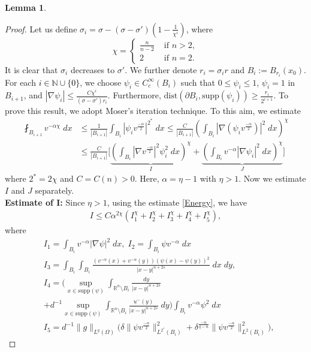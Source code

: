 \documentclass[11pt, notitlepage]{article}
\def\R{\mathbb{R}}
\newtheorem{Lemma}[Theorem]{Lemma}
\begin{document}
{\begin{Lemma}
\end{Lemma}
\begin{proof}
Let us define $\sigma_i=\sigma-(\sigma-\sigma')(1-\frac{1}{\chi^i})$, where $$\chi=\begin{cases}
    \frac{n}{n-2}&\text{ if }n>2,\\
    2&\text{ if }n=2.
\end{cases}$$
It is clear that $\sigma_i$ decreases to $\sigma'$. We further denote $r_i=\sigma_i r$ and $B_i:=B_{r_i}(x_0)$. For each \textcolor{black}{$i\in \mathbb{N}\cup\{0\}$}, we choose $\psi_i\in C^\infty_c(B_i)$ such that $0\leq \psi_i\leq 1$, $\psi_i=1$ in $B_{i+1}$, and $|\nabla\psi_i|\leq \frac{C\chi^i}{(\sigma-\sigma')r_i}$. Furthermore, $\mathrm{dist}(\partial B_i,\mathrm{supp}(\psi_i))\geq \frac{r_i}{2^{i+1}}$. To prove this result, we adopt Moser's iteration technique. To this aim, we estimate
\begin{align}
    \fint_{B_{i+1}}v^{-\alpha\chi}\;dx&\leq \frac{1}{|B_{i+1}|}\int_{B_{i}}|\psi_i v^\frac{-\alpha}{2}|^{2^*}\;dx\leq \frac{C}{|B_{i+1}|}\left(\int_{B_i}|\nabla(\psi_iv^\frac{-\alpha}{2})|^2\;dx\right)^\chi\nonumber\\
    &\leq \frac{C}{|B_{i+1}|}\Big[ \underbrace{\left(\int_{B_i}|\nabla v^\frac{-\alpha}{2}|^2\psi_i^2\;dx\right)^\chi}_{I}+ \underbrace{\left(\int_{B_i}v^{-\alpha}|\nabla\psi_i|^2\;dx\right)^\chi}_{J}\Big]
\end{align}
where $2^*=2\chi$ and $C=C(n)>0$. Here, $\alpha=\eta-1$ with $\eta>1$. Now we estimate $I$ and $J$ separately.\\
\textbf{Estimate of I:} Since $\eta>1$, using the estimate \eqref{Energy}, we have
\begin{align}\label{Ma0}
    I\leq C\alpha^{2\chi}(I_1^\chi+I_2^\chi+I_3^\chi+I_4^\chi+I_5^\chi),
\end{align}
where 
\begin{align*}
    &I_1=\int_{B_{i}}v^{-\alpha}|\nabla\psi|^2\;dx,\; I_2=\int_{B_{i}}\psi v^{-\alpha}\;dx\\
    &I_3= \int_{B_{i}}\int_{B_{i}}\frac{(v^{-\alpha}(x)+v^{-\alpha}(y))(\psi(x)-\psi(y))^2}{|x-y|^{n+2s}}\;dx\;dy,\\
    &I_4= \Big(\sup_{x\in\mathrm{supp}(\psi)}\int_{\R^n\setminus B_{i}}\frac{dy}{|x-y|^{n+2s}}\nonumber\\
        &+d^{-1}\sup_{x\in\mathrm{supp}(\psi)}\int_{\R^n\setminus B_{i}}\frac{u^{-}(y)}{|x-y|^{n+2s}}\;dy\Big)\int_{B_{i}}v^{-\alpha}\psi^2\;dx\\
        &I_5= d^{-1}\|g\|_{L^q(\Omega)}\Big(\delta\|\psi v^\frac{-\alpha}{2}\|_{L^{2^*}(B_{i})}^2+\delta^\frac{-n}{q-n}\|\psi v^\frac{-\alpha}{2}\|_{L^{2}(B_{i})}^2\Big),

\end{align*}
\end{proof}}
\end{document}
